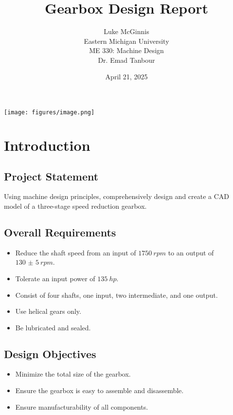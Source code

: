 \documentclass[titlepage]{article} %
\begin{document}
\title{Gearbox Design Report}
\author{Luke McGinnis\\Eastern Michigan University \\ME 330: Machine Design\\Dr. Emad Tanbour}

\date{April 21, 2025}

\maketitle

\tableofcontents

\begin{center}
    \texttt{[image: figures/image.png]}
\end{center}

\section{Introduction}

\subsection{Project Statement}
Using machine design principles, comprehensively design and create a CAD model
of a three-stage speed reduction gearbox. 

\subsection{Overall Requirements}
\begin{itemize}
    \item Reduce the shaft speed from an input of $\SI{1750}{rpm}$ to an output
    of $\SI{130(5)}{rpm}$.
    \item Tolerate an input power of $\SI{135}{hp}$.
    \item Consist of four shafts, one input, two intermediate, and one output.
    \item Use helical gears only.
    \item Be lubricated and sealed.
\end{itemize}

\subsection{Design Objectives}
\begin{itemize}
    \item Minimize the total size of the gearbox.
    \item Ensure the gearbox is easy to assemble and disassemble.
    \item Ensure manufacturability of all components.
\end{itemize}
\end{document}
